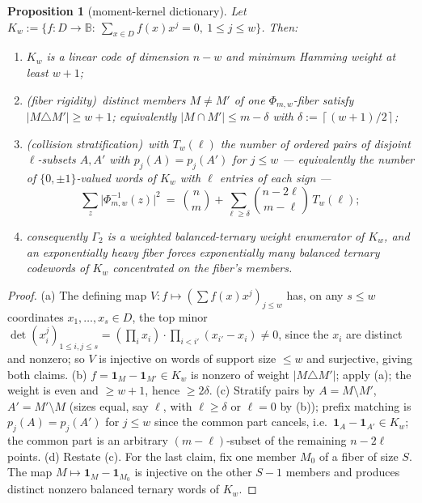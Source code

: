 \documentclass[11pt]{article}
\newtheorem{proposition}[proposition]{Proposition}
\theoremstyle{definition}
\theoremstyle{remark}
\newcommand{\B}{\mathbb{B}}
\providecommand{\ceil}[1]{\left\lceil #1\right\rceil}
\begin{document}
\begin{proposition}[moment-kernel dictionary]\label{prop:capfp-kernel}
Let $K_w:=\{f:D\to\B:\ \sum_{x\in D}f(x)x^j=0,\ 1\le j\le w\}$.  Then:
\begin{enumerate}[label=\textup{(\alph*)}]
\item $K_w$ is a linear code of dimension $n-w$ and minimum Hamming weight at least $w+1$;
\item \textup(fiber rigidity\textup)\ distinct members $M\ne M'$ of one $\Phi_{m,w}$-fiber satisfy $|M\triangle M'|\ge w+1$; equivalently $|M\cap M'|\le m-\delta$ with $\delta:=\ceil{(w+1)/2}$;
\item \textup(collision stratification\textup)\ with $T_w(\ell)$ the number of ordered pairs of disjoint $\ell$-subsets $A,A'$ with $p_j(A)=p_j(A')$ for $j\le w$ --- equivalently the number of $\{0,\pm1\}$-valued words of $K_w$ with $\ell$ entries of each sign ---
\[
        \sum_z\bigl|\Phi_{m,w}^{-1}(z)\bigr|^2
        \ =\ \binom nm+\sum_{\ell\ge\delta}\binom{n-2\ell}{m-\ell}\,T_w(\ell);
\]
\item consequently $\Gamma_2$ is a weighted balanced-ternary weight enumerator of $K_w$, and an exponentially heavy fiber forces exponentially many balanced ternary codewords of $K_w$ concentrated on the fiber's members.
\end{enumerate}
\end{proposition}

\begin{proof}
\textup{(a)}  The defining map $V:f\mapsto(\sum f(x)x^j)_{j\le w}$ has, on any $s\le w$ coordinates $x_1,\ldots,x_s\in D$, the top minor $\det(x_i^j)_{1\le i,j\le s}=(\prod_ix_i)\cdot\prod_{i<i'}(x_{i'}-x_i)\ne0$, since the $x_i$ are distinct and nonzero; so $V$ is injective on words of support size $\le w$ and surjective, giving both claims.
\textup{(b)}  $f=\mathbf1_{M}-\mathbf1_{M'}\in K_w$ is nonzero of weight $|M\triangle M'|$; apply \textup{(a)}; the weight is even and $\ge w+1$, hence $\ge2\delta$.
\textup{(c)}  Stratify pairs by $A=M\setminus M'$, $A'=M'\setminus M$ \textup(sizes equal, say $\ell$, with $\ell\ge\delta$ or $\ell=0$ by \textup{(b)}\textup); prefix matching is $p_j(A)=p_j(A')$ for $j\le w$ since the common part cancels, i.e.\ $\mathbf1_A-\mathbf1_{A'}\in K_w$; the common part is an arbitrary $(m-\ell)$-subset of the remaining $n-2\ell$ points.
\textup{(d)}  Restate \textup{(c)}.  For the last claim, fix one member $M_0$ of a fiber of size $S$.  The map $M\mapsto\mathbf1_M-\mathbf1_{M_0}$ is injective on the other $S-1$ members and produces distinct nonzero balanced ternary words of $K_w$.
\end{proof}
\end{document}
